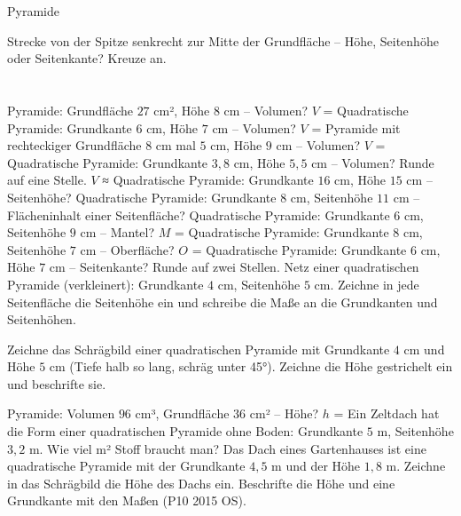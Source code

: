 \begin{aufgabe}{Pyramide}
\begin{teile}
\teil Strecke von der Spitze senkrecht zur Mitte der Grundfläche – Höhe, Seitenhöhe oder Seitenkante? Kreuze an.\\ \\ \\ 
\teil Pyramide: Grundfläche $27$ cm², Höhe $8$ cm – Volumen? $V$ = \leerfeld[cm³]
\teil Quadratische Pyramide: Grundkante $6$ cm, Höhe $7$ cm – Volumen? $V$ = \leerfeld[cm³]
\teil Pyramide mit rechteckiger Grundfläche $8$ cm mal $5$ cm, Höhe $9$ cm – Volumen? $V$ = \leerfeld[cm³]
\teil Quadratische Pyramide: Grundkante $3{,}8$ cm, Höhe $5{,}5$ cm – Volumen? Runde auf eine Stelle. $V$ ≈ \leerfeld[cm³]
\teil Quadratische Pyramide: Grundkante $16$ cm, Höhe $15$ cm – Seitenhöhe? \leerfeld[cm]
\teil Quadratische Pyramide: Grundkante $8$ cm, Seitenhöhe $11$ cm – Flächeninhalt einer Seitenfläche? \leerfeld[cm²]
\teil Quadratische Pyramide: Grundkante $6$ cm, Seitenhöhe $9$ cm – Mantel? $M$ = \leerfeld[cm²]
\teil Quadratische Pyramide: Grundkante $8$ cm, Seitenhöhe $7$ cm – Oberfläche? $O$ = \leerfeld[cm²]
\teil Quadratische Pyramide: Grundkante $6$ cm, Höhe $7$ cm – Seitenkante? Runde auf zwei Stellen. \leerfeld[cm]
\teil Netz einer quadratischen Pyramide (verkleinert): Grundkante $4$ cm, Seitenhöhe $5$ cm. Zeichne in jede Seitenfläche die Seitenhöhe ein und schreibe die Maße an die Grundkanten und Seitenhöhen.

\teil Zeichne das Schrägbild einer quadratischen Pyramide mit Grundkante $4$ cm und Höhe $5$ cm (Tiefe halb so lang, schräg unter 45°). Zeichne die Höhe gestrichelt ein und beschrifte sie.

\teil Pyramide: Volumen $96$ cm³, Grundfläche $36$ cm² – Höhe? $h$ = \leerfeld[cm]
\teil Ein Zeltdach hat die Form einer quadratischen Pyramide ohne Boden: Grundkante $5$ m, Seitenhöhe $3{,}2$ m. Wie viel m² Stoff braucht man? \leerfeld[m²]
\teil Das Dach eines Gartenhauses ist eine quadratische Pyramide mit der Grundkante $4{,}5$ m und der Höhe $1{,}8$ m. Zeichne in das Schrägbild die Höhe des Dachs ein. Beschrifte die Höhe und eine Grundkante mit den Maßen \hfill (P10 2015 OS).

\end{teile}
\end{aufgabe}


